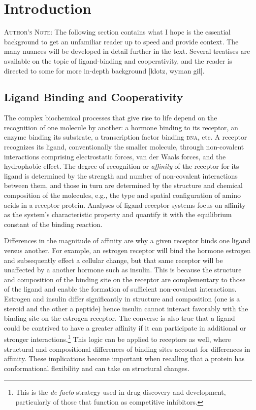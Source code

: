 \documentclass{article}
\numberwithin{equation}{section}
\begin{document}
\renewcommand{\thefootnote}{\fnsymbol{footnote}}

\section{Introduction}

\textsc{Author's Note}: The following section contains what I hope is the essential background to get an unfamiliar reader up to speed and provide context. The many nuances will be developed in detail further in the text. Several treatises are available on the topic of ligand-binding and cooperativity, and the reader is directed to some for more in-depth background [klotz, wyman gil].

\subsection{Ligand Binding and Cooperativity}

The complex biochemical processes that give rise to life depend on the recognition of one molecule by another: a hormone binding to its receptor, an enzyme binding its substrate, a transcription factor binding \textsc{dna}, etc. A receptor recognizes its ligand, conventionally the smaller molecule, through non-covalent interactions comprising electrostatic forces, van der Waals forces, and the hydrophobic effect. The degree of recognition or \emph{affinity} of the receptor for its ligand is determined by the strength and number of non-covalent interactions between them, and those in turn are determined by the structure and chemical composition of the molecules, e.g., the type and spatial configuration of amino acids in a receptor protein. Analyses of ligand-receptor systems focus on affinity as the system's characteristic property and quantify it with the equilibrium constant of the binding reaction.


Differences in the magnitude of affinity are why a given receptor binds one ligand versus another. For example, an estrogen receptor will bind the hormone estrogen and subsequently effect a cellular change, but that same receptor will be unaffected by a another hormone such as insulin. This is because the structure and composition of the binding site on the receptor are complementary to those of the ligand and enable the formation of sufficient non-covalent interactions. Estrogen and insulin differ significantly in structure and composition (one is a steroid and the other a peptide) hence insulin cannot interact favorably with the binding site on the estrogen receptor. The converse is also true that a ligand could be contrived to have a greater affinity if it can participate in additional or stronger interactions.\footnote{This is the \emph{de facto} strategy used in drug discovery and development, particularly of those that function as competitive inhibitors.} This logic can be applied to receptors as well, where structural and compositional differences of binding sites account for differences in affinity. These implications become important when recalling that a protein has conformational flexibility and can take on structural changes.
\end{document}
